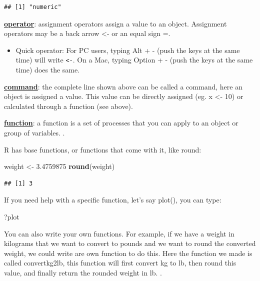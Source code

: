 \documentclass[
]{book}
\newenvironment{Shaded}{\begin{snugshade}}{\end{snugshade}}
\newcommand{\FloatTok}[1]{\textcolor[rgb]{0.00,0.00,0.81}{#1}}
\newcommand{\KeywordTok}[1]{\textcolor[rgb]{0.13,0.29,0.53}{\textbf{#1}}}
\newcommand{\NormalTok}[1]{#1}
\newcommand{\StringTok}[1]{\textcolor[rgb]{0.31,0.60,0.02}{#1}}
\providecommand{\tightlist}{%
  \setlength{\itemsep}{0pt}\setlength{\parskip}{0pt}}
\begin{document}
\begin{verbatim}
## [1] "numeric"
\end{verbatim}

\href{https://stat.ethz.ch/R-manual/R-devel/library/base/html/Syntax.html}{\textbf{operator}}: assignment operators assign a value to an object. Assignment operators may be a back arrow \textless- or an equal sign =.

\begin{itemize}
\tightlist
\item
  Quick operator: For PC users, typing Alt + - (push the keys at the same time) will write \texttt{\textless{}-}. On a Mac, typing Option + - (push the keys at the same time) does the same.
\end{itemize}

\href{https://personality-project.org/r/r.commands.html}{\textbf{command}}: the complete line shown above can be called a command, here an object is assigned a value. This value can be directly assigned (eg. x \textless- 10) or calculated through a function (see above).

\href{\%22https://www.tutorialspoint.com/r/r_functions.htm\%22}{\textbf{function}}: a function is a set of processes that you can apply to an object or group of variables. .

R has base functions, or functions that come with it, like round:

\begin{Shaded}
\begin{Highlighting}[]
\NormalTok{weight \textless{}{-}}\StringTok{ }\FloatTok{3.4759875}
\KeywordTok{round}\NormalTok{(weight)}
\end{Highlighting}
\end{Shaded}

\begin{verbatim}
## [1] 3
\end{verbatim}

If you need help with a specific function, let's say plot(), you can type:

\begin{Shaded}
\begin{Highlighting}[]
\NormalTok{?plot}
\end{Highlighting}
\end{Shaded}

You can also write your own functions. For example, if we have a weight in kilograms that we want to convert to pounds and we want to round the converted weight, we could write are own function to do this. Here the function we made is called convertkg2lb, this function will first convert kg to lb, then round this value, and finally return the rounded weight in lb. .
\end{document}
